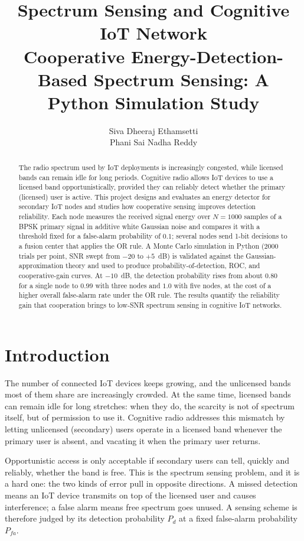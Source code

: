 \documentclass[11pt,a4paper]{article}
\title{\textbf{Spectrum Sensing and Cognitive IoT Network}\\[4pt]
\large Cooperative Energy-Detection-Based Spectrum Sensing: A Python Simulation Study}
\author{Siva Dheeraj Ethamsetti \\ Phani Sai Nadha Reddy}
\date{}
\begin{document}
\maketitle

\begin{abstract}
The radio spectrum used by IoT deployments is increasingly congested, while licensed
bands can remain idle for long periods. Cognitive radio allows IoT devices to
use a licensed band opportunistically, provided they can reliably detect whether the
primary (licensed) user is active. This project designs and evaluates an energy
detector for secondary IoT nodes and studies how cooperative sensing improves
detection reliability. Each node measures the received signal energy over $N = 1000$
samples of a BPSK primary signal in additive white Gaussian noise and compares it
with a threshold fixed for a false-alarm probability of $0.1$; several nodes send
1-bit decisions to a fusion center that applies the OR rule. A Monte Carlo
simulation in Python (2000 trials per point, SNR swept from $-20$ to $+5$~dB) is
validated against the Gaussian-approximation theory and used to produce
probability-of-detection, ROC, and cooperative-gain curves. At $-10$~dB, the
detection probability rises from about $0.80$ for a single node to $0.99$ with three
nodes and $1.0$ with five nodes, at the cost of a higher overall false-alarm rate
under the OR rule. The results quantify the reliability gain that cooperation brings
to low-SNR spectrum sensing in cognitive IoT networks.
\end{abstract}

\section{Introduction}

The number of connected IoT devices keeps growing, and the unlicensed bands most of
them share are increasingly crowded. At the same time, licensed bands can remain
idle for long stretches: when they do, the scarcity is not of spectrum itself, but
of permission to use it. Cognitive radio addresses this
mismatch by letting unlicensed (secondary) users operate in a licensed band whenever
the primary user is absent, and vacating it when the primary user returns.

Opportunistic access is only acceptable if secondary users can tell, quickly and
reliably, whether the band is free. This is the spectrum sensing problem, and it is
a hard one: the two kinds of error pull in opposite directions. A missed detection
means an IoT device transmits on top of the licensed user and causes interference; a
false alarm means free spectrum goes unused. A sensing scheme is therefore judged by
its detection probability $P_d$ at a fixed false-alarm probability $P_{fa}$.
\end{document}
